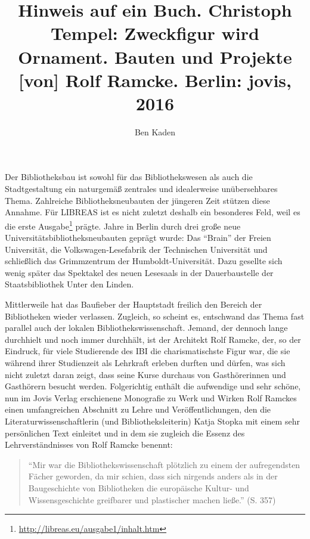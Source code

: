 \documentclass[a4paper,
fontsize=11pt,
oneside,
numbers=noperiodatend,
parskip=half-,
bibliography=totoc,
final
]{scrartcl}
\title{\LARGE{Hinweis auf ein Buch. Christoph Tempel: Zweckfigur wird Ornament. Bauten und Projekte [von] Rolf Ramcke. Berlin: jovis, 2016}} %
\author{Ben Kaden} %
\date{}
\begin{document}
\maketitle
\thispagestyle{fancyplain} 


Der Bibliotheksbau ist sowohl für das Bibliothekswesen als auch die
Stadtgestaltung ein naturgemäß zentrales und idealerweise unübersehbares
Thema. Zahlreiche Bibliotheksneubauten der jüngeren Zeit stützen diese
Annahme. Für LIBREAS ist es nicht zuletzt deshalb ein besonderes Feld,
weil es die erste Ausgabe\footnote{\url{http://libreas.eu/ausgabe1/inhalt.htm}}
prägte. Jahre in Berlin durch drei große neue
Universitätsbibliotheksneubauten geprägt wurde: Das \enquote{Brain} der
Freien Universität, die Volkswagen-Lesefabrik der Technischen
Universität und schließlich das Grimmzentrum der Humboldt-Universität.
Dazu gesellte sich wenig später das Spektakel des neuen Lesesaals in der
Dauerbaustelle der Staatsbibliothek Unter den Linden.

Mittlerweile hat das Baufieber der Hauptstadt freilich den Bereich der
Bibliotheken wieder verlassen. Zugleich, so scheint es, entschwand das
Thema fast parallel auch der lokalen Bibliothekswissenschaft. Jemand,
der dennoch lange durchhielt und noch immer durchhält, ist der Architekt
Rolf Ramcke, der, so der Eindruck, für viele Studierende des IBI die
charismatischste Figur war, die sie während ihrer Studienzeit als
Lehrkraft erleben durften und dürfen, was sich nicht zuletzt daran
zeigt, dass seine Kurse durchaus von Gasthörerinnen und Gasthörern
besucht werden. Folgerichtig enthält die aufwendige und sehr schöne, nun
im Jovis Verlag erschienene Monografie zu Werk und Wirken Rolf Ramckes
einen umfangreichen Abschnitt zu Lehre und Veröffentlichungen, den die
Literaturwissenschaftlerin (und Bibliotheksleiterin) Katja Stopka mit
einem sehr persönlichen Text einleitet und in dem sie zugleich die
Essenz des Lehrverständnisses von Rolf Ramcke benennt:

\begin{quote}
\enquote{Mir war die Bibliothekswissenschaft plötzlich zu einem der
aufregendsten Fächer geworden, da mir schien, dass sich nirgends anders
als in der Baugeschichte von Bibliotheken die europäische Kultur- und
Wissensgeschichte greifbarer und plastischer machen ließe.} (S. 357)
\end{quote}
\end{document}

